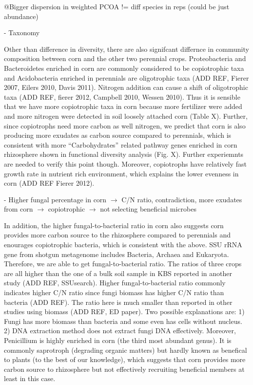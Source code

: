\documentclass[12pt]{article}
\begin{document}
@Bigger dispersion in weighted PCOA != diff species in reps (could be just abundance)

- Taxonomy

Other than difference in diversity, there are also signifcant differnce in community composition between corn and the other two perennial crops. Proteobacteria and Bacteroidetes enriched in corn are commonly considered to be copiotrophic taxa and Acidobacteria enriched in perennials are oligotrophic taxa (ADD REF, Fierer 2007, Eilers 2010, Davis 2011). Nitrogen addition can cause a shift of oligotrophic taxa (ADD REF, fierer 2012, Campbell 2010, Wessen 2010). Thus it is sensible that we have more copiotrophic taxa in corn because more fertilizer were added and more nitrogen were detected in soil loosely attached corn (Table X). Further, since copiotrophs need more carbon as well nitrogen, we predict that corn is also producing more exudates as carbon source compared to perennials, which is consistent with more ``Carbohydrates'' related pathway genes enriched in corn rhizosphere shown in functional diversity analysis (Fig. X). Further experiemnts are needed to verify this point though. Moreover, copiotrophs have relatively fast growth rate in nutrient rich environment, which explains the lower evenness in corn (ADD REF Fierer 2012).

- Higher fungal percentage in corn $\rightarrow$ C/N ratio, contradiction, more exudates from corn $\rightarrow$ copiotrophic $\rightarrow$ not selecting beneficial microbes

In addition, the higher fungal-to-bacterial ratio in corn also suggests corn provides more carbon source to the rhizosphere compared to perennials and enourages copiotrophic bacteria, which is consistent with the above. SSU rRNA gene from shotgun metagenome includes Bacteria, Archaea and Eukaryota. Therefore, we are able to get fungal-to-bacterial ratio. The ratios of three crops are all higher than the one of a bulk soil sample in KBS reported in another study (ADD REF, SSUsearch). Higher fungal-to-bacterial ratio commonly indicates higher C/N ratio since fungi biomass has higher C/N ratio than bacteria (ADD REF). The ratio here is much smaller than reported in other studies using biomass (ADD REF, ED paper). Two possible explanations are: 1) Fungi has more biomass than bacteria and some even has cells without nucleus. 2) DNA extraction method does not extract fungi DNA effectively. Moreover, Penicillium is highly enriched in corn (the third most abundant genus). It is commonly saprotroph (degrading organic matters) but hardly known as benefical to plants (to the best of our knowledge), which suggests that corn provides more carbon source to rhizosphere but not effectively recruiting beneficial members at least in this case.
\end{document}
